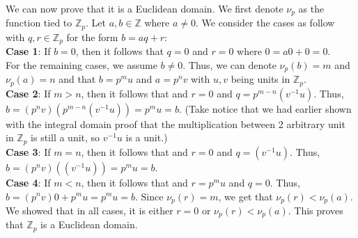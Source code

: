 \documentclass{article}
\begin{document}
\begin{enumerate}
\begin{enumerate}
    We can now prove that it is a Euclidean domain. We first denote $\nu_p$ as the function tied to $\mathbb{Z}_p$. Let $a, b \in \mathbb{Z}$ where $a \neq 0$. We consider the cases as follow with $q, r \in \mathbb{Z}_p$ for the form $b = aq + r$:\\

    \textbf{Case 1}: If $b = 0$, then it follows that $q = 0$ and $r = 0$ where $0 = a0 + 0 = 0$. \\

    For the remaining cases, we assume $b \neq 0$. Thus, we can denote $\nu_p(b) = m$ and $\nu_p(a) = n$ and that $b = p^mu$ and $a = p^nv$ with $u, v$ being units in $\mathbb{Z}_p$.\\

    \textbf{Case 2}: If $m > n$, then it follows that and $r = 0$ and $q = p^{m-n}(v^{-1}u)$. Thus, $b = (p^nv)(p^{m-n}(v^{-1}u)) = p^mu = b$. (Take notice that we had earlier shown with the integral domain proof that the multiplication between 2 arbitrary unit in $\mathbb{Z}_p$ is still a unit, so $v^{-1}u$ is a unit.) \\

    \textbf{Case 3}: If $m = n$, then it follows that and $r = 0$ and $q = (v^{-1}u)$. Thus, $b = (p^nv)((v^{-1}u)) = p^mu = b$. \\

    \textbf{Case 4}: If $m < n$, then it follows that and $r = p^mu$ and $q = 0$. Thus, $b = (p^nv)0 + p^mu = p^mu = b$. Since $\nu_p(r) = m$, we get that $\nu_p(r) < \nu_p(a)$. \\

    We showed that in all cases, it is either $r = 0$ or $\nu_p(r) < \nu_p(a)$. This proves that $\mathbb{Z}_p$ is a Euclidean domain. 

\end{enumerate}

\end{enumerate}
\end{document}
